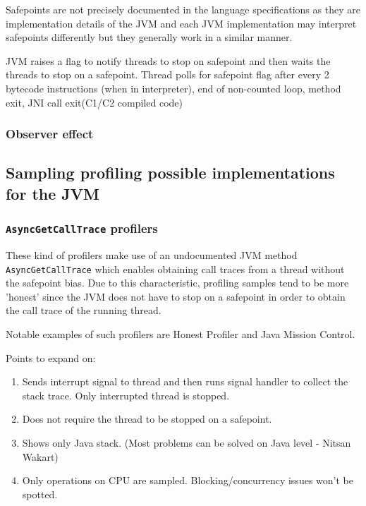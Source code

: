 \documentclass[..thesis.tex]{subfiles}
\begin{document}
Safepoints are not precisely documented in the language specifications as they are implementation details of the JVM and each JVM implementation may interpret safepoints differently but they generally work in a similar manner.

JVM raises a flag to notify threads to stop on safepoint and then waits the threads to stop on a safepoint. Thread polls for safepoint flag after every 2 bytecode instructions (when in interpreter), end of non-counted loop, method exit, JNI call exit(C1/C2 compiled code)

\subsubsection{Observer effect}

\subsection{Sampling profiling possible implementations for the JVM}



\subsubsection{\texttt{AsyncGetCallTrace} profilers}
These kind of profilers make use of an undocumented JVM method \texttt{Async\-Get\-Call\-Trace} \cite{agct_source} which enables obtaining call traces from a thread without the safepoint bias. Due to this characteristic, profiling samples tend to be more 'honest' since the JVM does not have to stop on a safepoint in order to obtain the call trace of the running thread.

Notable examples of such profilers are Honest Profiler and Java Mission Control. 


Points to expand on:
\begin{enumerate}
	\item Sends interrupt signal to thread and then runs signal handler to collect the stack trace. Only interrupted thread is stopped.
	\item Does not require the thread to be stopped on a safepoint.
	\item Shows only Java stack. (Most problems can be solved on Java level - Nitsan Wakart)
	\item Only operations on CPU are sampled. Blocking/concurrency issues won't be spotted.
\end{enumerate}
\end{document}
